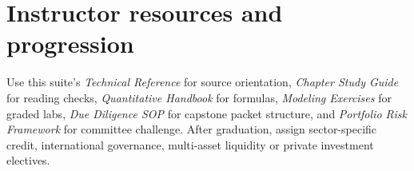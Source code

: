 \documentclass[11pt,letterpaper]{article}
\begin{document}
\section{Instructor resources and progression}
Use this suite's \emph{Technical Reference} for source orientation, \emph{Chapter Study Guide} for reading checks, \emph{Quantitative Handbook} for formulas, \emph{Modeling Exercises} for graded labs, \emph{Due Diligence SOP} for capstone packet structure, and \emph{Portfolio Risk Framework} for committee challenge. After graduation, assign sector-specific credit, international governance, multi-asset liquidity or private investment electives.
\end{document}
